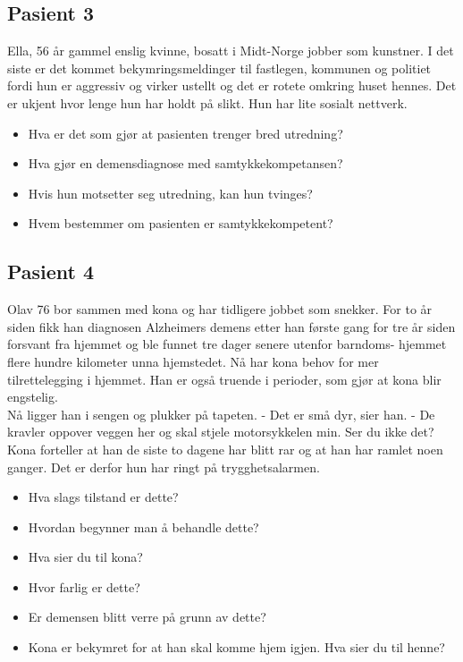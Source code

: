 			\subsection{Pasient 3}
				Ella, 56 år gammel enslig kvinne, bosatt i Midt-Norge jobber som kunstner. I det siste er det kommet bekymringsmeldinger til fastlegen, kommunen og politiet fordi hun er aggressiv og virker ustellt og det er rotete omkring huset hennes. Det er ukjent hvor lenge hun har holdt på slikt. Hun har lite sosialt nettverk.\\
					\begin{itemize}
						\item Hva er det som gjør at pasienten trenger bred utredning?\\
						\item Hva gjør en demensdiagnose med samtykkekompetansen?\\
						\item Hvis hun motsetter seg utredning, kan hun tvinges?\\
						\item Hvem bestemmer om pasienten er samtykkekompetent?\\
					\end{itemize}
			\subsection{Pasient 4}
				Olav 76 bor sammen med kona og har tidligere jobbet som snekker. For to år siden fikk han diagnosen Alzheimers demens etter han første gang for tre år siden forsvant fra hjemmet og ble funnet tre dager senere utenfor barndoms- hjemmet flere hundre kilometer unna hjemstedet. Nå har kona behov for mer tilrettelegging i hjemmet. Han er også truende i perioder, som gjør at kona blir engstelig. \\
				Nå ligger han i sengen og plukker på tapeten. - Det er små dyr, sier han. - De kravler oppover veggen her og skal stjele motorsykkelen min. Ser du ikke det?\\
				Kona forteller at han de siste to dagene har blitt rar og at han har ramlet noen ganger. Det er derfor hun har ringt på trygghetsalarmen.\\

					\begin{itemize}
						\item Hva slags tilstand er dette?\\
						\item Hvordan begynner man å behandle dette?\\
						\item Hva sier du til kona?\\
						\item Hvor farlig er dette?\\
						\item Er demensen blitt verre på grunn av dette?\\
						\item Kona er bekymret for at han skal komme hjem igjen. Hva sier du til henne?\\
					\end{itemize}	


\newpage